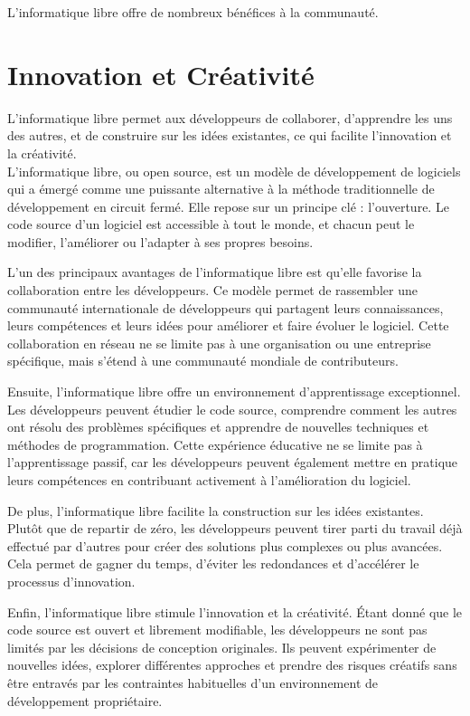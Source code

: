 L'informatique libre offre de nombreux bénéfices à la communauté.

\section{Innovation et Créativité}
L'informatique libre permet aux développeurs de collaborer, d'apprendre les uns des autres, et de construire sur les idées existantes, ce qui facilite l'innovation et la créativité.\\

L'informatique libre, ou open source, est un modèle de développement de logiciels qui a émergé comme une puissante alternative à la méthode traditionnelle de développement en circuit fermé. Elle repose sur un principe clé : l'ouverture. Le code source d'un logiciel est accessible à tout le monde, et chacun peut le modifier, l'améliorer ou l'adapter à ses propres besoins.

L'un des principaux avantages de l'informatique libre est qu'elle favorise la collaboration entre les développeurs. Ce modèle permet de rassembler une communauté internationale de développeurs qui partagent leurs connaissances, leurs compétences et leurs idées pour améliorer et faire évoluer le logiciel. Cette collaboration en réseau ne se limite pas à une organisation ou une entreprise spécifique, mais s'étend à une communauté mondiale de contributeurs.

Ensuite, l'informatique libre offre un environnement d'apprentissage exceptionnel. Les développeurs peuvent étudier le code source, comprendre comment les autres ont résolu des problèmes spécifiques et apprendre de nouvelles techniques et méthodes de programmation. Cette expérience éducative ne se limite pas à l'apprentissage passif, car les développeurs peuvent également mettre en pratique leurs compétences en contribuant activement à l'amélioration du logiciel.

De plus, l'informatique libre facilite la construction sur les idées existantes. Plutôt que de repartir de zéro, les développeurs peuvent tirer parti du travail déjà effectué par d'autres pour créer des solutions plus complexes ou plus avancées. Cela permet de gagner du temps, d'éviter les redondances et d'accélérer le processus d'innovation.

Enfin, l'informatique libre stimule l'innovation et la créativité. Étant donné que le code source est ouvert et librement modifiable, les développeurs ne sont pas limités par les décisions de conception originales. Ils peuvent expérimenter de nouvelles idées, explorer différentes approches et prendre des risques créatifs sans être entravés par les contraintes habituelles d'un environnement de développement propriétaire.

